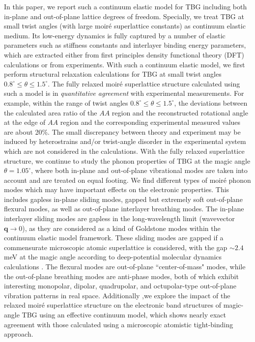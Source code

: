 \documentclass[aps,prx,10pt,twocolumn,superscriptaddress]{revtex4}
\def\q{\mathbf{q}}
\begin{document}
In this paper, we report such a continuum elastic model for TBG including both in-plane and out-of-plane lattice degrees of freedom. Specially, we treat TBG at small twist angles (with large moir\'e superlattice constants) as  continuum elastic medium. Its low-energy dynamics is fully captured by a number of elastic parameters such as stiffness constants and interlayer binding energy parameters, which are extracted either from first principles density functional theory (DFT) calculations or from experiments. With such a continuum elastic model, we first perform structural relaxation calculations for TBG at small twist angles $0.8^{\circ}\leq\theta\leq 1.5^{\circ}$. The fully relaxed moir\'e superlattice structure calculated using such a model is in \textit{quantitative agreement} with experimental measurements. For example, within the range of twist angles $0.8^{\circ}\leq\theta\leq 1.5^{\circ}$, the deviations between the calculated area ratio of the $AA$ region and the reconstructed rotational angle at the edge of $AA$ region and the corresponding experimental measured values  \cite{kazmierczak2021strain} are about 20\%. The small discrepancy between theory and experiment may be induced by heterostrains and/or twist-angle disorder in the experimental system which are not considered in the calculations. With the fully relaxed superlattice structure, we continue to study the phonon properties of TBG at the magic angle $\theta=1.05^{\circ}$, where both in-plane and out-of-plane vibrational modes are taken into account and are treated on equal footing. We find different types of moir\'e phonon modes which may have important effects on the electronic properties. This includes gapless in-plane sliding modes, gapped but extremely soft  out-of-plane flexural modes, as well as out-of-plane interlayer breathing modes. The in-plane interlayer sliding modes are gapless in the long-wavelength limit (wavevector $\q\to 0$), as they are considered as a kind of  Goldstone modes within the continuum elastic model framework. These sliding modes are gapped if a commensurate microscopic atomic superlattice is considered, with the gap $\sim 2.4\,$meV at the magic angle according to deep-potential molecular dynamics calculations \cite{liu-phonon-nano22}. The  flexural modes  are out-of-plane ``center-of-mass" modes, while the
out-of-plane breathing modes are anti-phase modes, both of which exhibit interesting monopolar, dipolar, quadrupolar, and octupolar-type out-of-plane vibration patterns in real space. Additionally ,we explore the impact of the relaxed moir\'e superlattice structure on the electronic band structures of magic-angle TBG using an effective continuum model, which shows nearly exact agreement with those calculated using a microscopic atomistic tight-binding approach.
\end{document}
